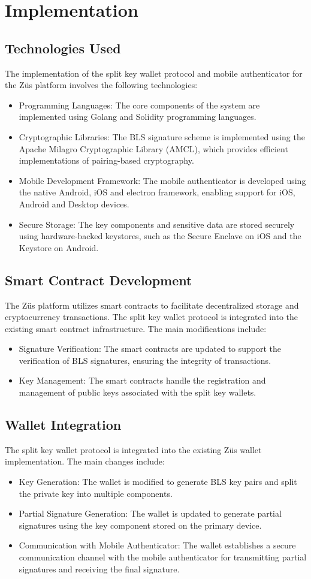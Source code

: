 \chapter{Implementation}
\label{Chapter4}
\section{Technologies Used}
The implementation of the split key wallet protocol and mobile authenticator for the Züs platform involves the following technologies:
\begin{itemize}
\item Programming Languages: The core components of the system are implemented using Golang and Solidity programming languages.
\item Cryptographic Libraries: The BLS signature scheme is implemented using the Apache Milagro Cryptographic Library (AMCL), which provides efficient implementations of pairing-based cryptography.
\item Mobile Development Framework: The mobile authenticator is developed using the native Android, iOS and electron framework, enabling support for iOS, Android and Desktop devices.
\item Secure Storage: The key components and sensitive data are stored securely using hardware-backed keystores, such as the Secure Enclave on iOS and the Keystore on Android.
\end{itemize}
\section{Smart Contract Development}
The Züs platform utilizes smart contracts to facilitate decentralized storage and cryptocurrency transactions. The split key wallet protocol is integrated into the existing smart contract infrastructure. The main modifications include:
\begin{itemize}
\item Signature Verification: The smart contracts are updated to support the verification of BLS signatures, ensuring the integrity of transactions.
\item Key Management: The smart contracts handle the registration and management of public keys associated with the split key wallets.
\end{itemize}
\section{Wallet Integration}
The split key wallet protocol is integrated into the existing Züs wallet implementation. The main changes include:
\begin{itemize}
\item Key Generation: The wallet is modified to generate BLS key pairs and split the private key into multiple components.
\item Partial Signature Generation: The wallet is updated to generate partial signatures using the key component stored on the primary device.
\item Communication with Mobile Authenticator: The wallet establishes a secure communication channel with the mobile authenticator for transmitting partial signatures and receiving the final signature.
\end{itemize}
